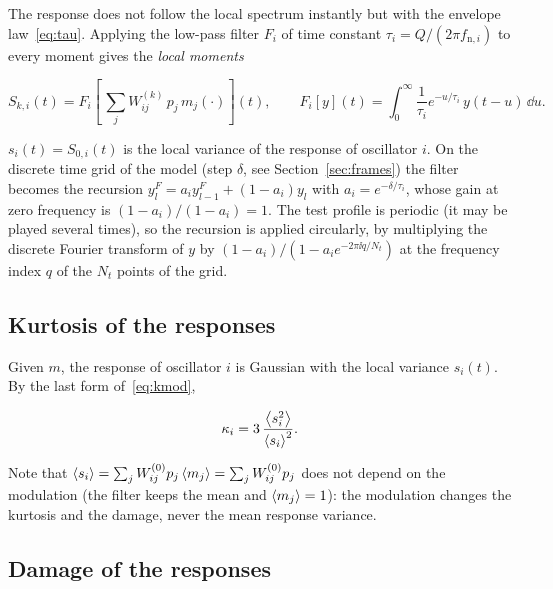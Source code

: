 The response does not follow the local spectrum instantly but with the envelope law~\eqref{eq:tau}.
Applying the low-pass filter $F_i$ of time constant $\tau_i = Q/(2\pi f_{\mathrm{n},i})$ to every
moment gives the \emph{local moments}
\begin{result}
\begin{equation}\label{eq:S}
  S_{k,i}(t) = F_i\!\left[\,\sum_j W^{(k)}_{ij}\,p_j\,m_j(\cdot)\right]\!(t),\qquad
  F_i[y](t) = \int_0^\infty \frac{1}{\tau_i}e^{-u/\tau_i}\,y(t-u)\,\dd u .
\end{equation}
\end{result}
$s_i(t) = S_{0,i}(t)$ is the local variance of the response of oscillator $i$. On the discrete time
grid of the model (step $\delta$, see Section~\ref{sec:frames}) the filter becomes the recursion
$y^F_l = a_iy^F_{l-1} + (1-a_i)y_l$ with $a_i = e^{-\delta/\tau_i}$, whose gain at zero frequency is
$(1-a_i)/(1-a_i) = 1$. The test profile is periodic (it may be played several times), so the
recursion is applied circularly, by multiplying the discrete Fourier transform of $y$ by
$(1-a_i)/(1-a_ie^{-2\pi\ii q/N_t})$ at the frequency index $q$ of the $N_t$ points of the grid.

\subsection{Kurtosis of the responses}\label{sec:kurtmodel}

Given $m$, the response of oscillator $i$ is Gaussian with the local variance $s_i(t)$. By the last
form of~\eqref{eq:kmod},
\begin{result}
\begin{equation}\label{eq:kappamodel}
  \kappa_i = 3\,\frac{\left\langle s_i^2 \right\rangle}{\left\langle s_i \right\rangle^2}.
\end{equation}
\end{result}
Note that $\left\langle s_i \right\rangle = \sum_jW^{(0)}_{ij}p_j\left\langle m_j \right\rangle = \sum_jW^{(0)}_{ij}p_j$ does not depend on
the modulation (the filter keeps the mean and $\left\langle m_j \right\rangle=1$): the modulation changes the kurtosis
and the damage, never the mean response variance.

\subsection{Damage of the responses}\label{sec:damagemodel}

